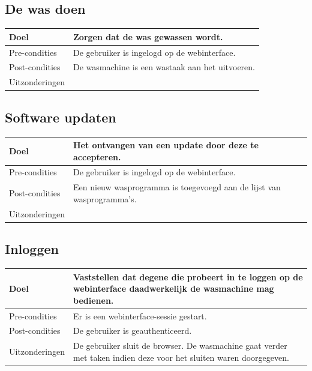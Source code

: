\subsection{De was doen}
\begin{center}
  \begin{tabular}{ | p{4cm} | p{8.5cm} | }    \hline
    Doel & Zorgen dat de was gewassen wordt. \\ \hline
    Pre-condities & De gebruiker is ingelogd op de webinterface. \\ \hline
    Post-condities & De wasmachine is een wastaak aan het uitvoeren. \\ \hline
    Uitzonderingen & \\
    \hline
  \end{tabular}
\end{center}

\subsection{Software updaten}
\begin{center}
  \begin{tabular}{ | p{4cm} | p{8.5cm} | }    \hline
    Doel & Het ontvangen van een update door deze te accepteren. \\ \hline
    Pre-condities & De gebruiker is ingelogd op de webinterface. \\ \hline
    Post-condities & Een nieuw wasprogramma is toegevoegd aan de lijst van wasprogramma's. \\ \hline
    Uitzonderingen &  \\
    \hline
  \end{tabular}
\end{center}

\subsection{Inloggen}
\begin{center}
  \begin{tabular}{ | p{4cm} | p{8.5cm} | } \hline
  Doel & Vaststellen dat degene die probeert in te loggen op de webinterface daadwerkelijk de wasmachine mag bedienen. \\ \hline
  Pre-condities & Er is een webinterface-sessie gestart.\\ \hline
  Post-condities & De gebruiker is geauthenticeerd. \\ \hline
  Uitzonderingen & De gebruiker sluit de browser. De wasmachine gaat verder met taken indien deze voor het sluiten waren doorgegeven. \\
  \end{tabular}
\end{center}

